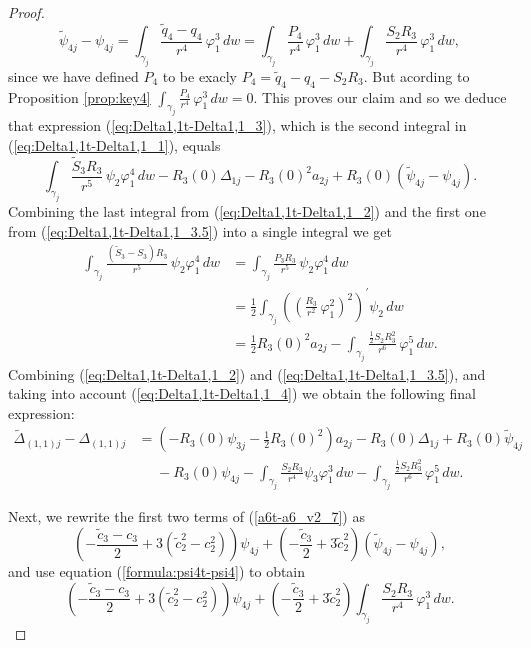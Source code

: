 \begin{proof}
\[ \tilde{\psi}_{4j}-\psi_{4j}=\int_{\gamma_j}\frac{\tilde{q}_4-q_4}{r^4}\,\varphi_1^3\,dw= \int_{\gamma_j}\frac{P_4}{r^4}\,\varphi_1^3\,dw+\int_{\gamma_j}\frac{S_2R_3}{r^4}\,\varphi_1^3\,dw, \]
since we have defined $P_4$ to be exacly $P_4=\tilde{q}_4-q_4-S_2R_3$. But acording to Proposition \ref{prop:key4} $\int_{\gamma_j}\frac{P_4}{r^4}\,\varphi_1^3\,dw=0$. This proves our claim and so we deduce that expression (\ref{eq:Delta1,1t-Delta1,1_3}), which is the second integral in (\ref{eq:Delta1,1t-Delta1,1_1}), equals
\begin{equation}\label{eq:Delta1,1t-Delta1,1_3.5}
\int_{\gamma_j}\frac{\widetilde{S}_3R_3}{r^5}\,\psi_2\varphi_1^4\,dw -R_3(0)\Delta_{1j}-R_3(0)^2a_{2j}+R_3(0)(\tilde{\psi}_{4j}-\psi_{4j}).
\end{equation}
Combining the last integral from (\ref{eq:Delta1,1t-Delta1,1_2}) and the first one from (\ref{eq:Delta1,1t-Delta1,1_3.5}) into a single integral we get
\begin{align}
\int_{\gamma_j}\frac{(\widetilde{S}_3-S_3)R_3}{r^5}\,\psi_2\varphi_1^4\,dw &= \int_{\gamma_j}\frac{P_3R_3}{r^5}\,\psi_2\varphi_1^4\,dw \nonumber \\
&= \frac{1}{2}\int_{\gamma_j}\left(\left(\frac{R_3}{r^2}\,\varphi_1^2\right)^2\right)^{\prime}\psi_2\,dw \nonumber \\
&= \frac{1}{2}R_3(0)^2a_{2j}-\int_{\gamma_j}\frac{\frac{1}{2}S_2R_3^2}{r^6}\,\varphi_1^5\,dw. \label{eq:Delta1,1t-Delta1,1_4}
\end{align}
Combining (\ref{eq:Delta1,1t-Delta1,1_2}) and (\ref{eq:Delta1,1t-Delta1,1_3.5}), and taking into account (\ref{eq:Delta1,1t-Delta1,1_4}) we obtain the following final expression:
\begin{align}
\widetilde{\Delta}_{(1,1)j}-\Delta_{(1,1)j} &= \left(-R_3(0)\psi_{3j}-\frac{1}{2}R_3(0)^2\right)a_{2j}-R_3(0)\Delta_{1j} +R_3(0)\tilde{\psi}_{4j} \nonumber \\
&\phantom{=} -R_3(0)\psi_{4j} -\int_{\gamma_j}\frac{S_2R_3}{r^4}\psi_3\varphi_1^3\,dw -\int_{\gamma_j}\frac{\frac{1}{2}S_2R_3^2}{r^6}\,\varphi_1^5\,dw. \label{eq:Delta1,1t-Delta1,1}
\end{align}

Next, we rewrite the first two terms of (\ref{a6t-a6_v2_7}) as
\[ \left(-\frac{\tilde{c}_3-c_3}{2}+3(\tilde{c}_2^2-c_2^2)\right)\psi_{4j} +\left(-\frac{\tilde{c}_3}{2}+3\tilde{c}_2^2\right)(\tilde{\psi}_{4j}-\psi_{4j}), \]
and use equation (\ref{formula:psi4t-psi4}) to obtain
\begin{equation}\label{eq:psi4t-psi4}
 \left(-\frac{\tilde{c}_3-c_3}{2}+3(\tilde{c}_2^2-c_2^2)\right)\psi_{4j}+\left(-\frac{\tilde{c}_3}{2}+3\tilde{c}_2^2\right)\int_{\gamma_j}\frac{S_2R_3}{r^4}\,\varphi_1^3\,dw.
\end{equation}


\end{proof}
